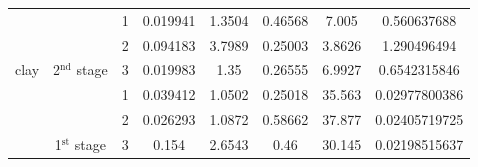 \documentclass[review]{elsarticle}
\begin{document}
\begin{table}[]
\begin{small}
\begin{tabular}{|l|c|c|c|c|c|c|c|}
                                             &                                         & \cellcolor[HTML]{C0C0C0}1 & \cellcolor[HTML]{C0C0C0}0.019941 & \cellcolor[HTML]{C0C0C0}1.3504  & \cellcolor[HTML]{C0C0C0}0.46568 & \cellcolor[HTML]{C0C0C0}7.005   & \cellcolor[HTML]{C0C0C0}0.560637688                                                                                             \\ \cline{3-8} 
                                             &                                         & 2                         & 0.094183                         & 3.7989                          & 0.25003                         & 3.8626                          & 1.290496494                                                                                                                     \\ \cline{3-8} 
\multirow{-6}{*}{clay}                       & \multirow{-3}{*}{2$^{\mbox{nd}}$ stage} & 3                         & 0.019983                         & 1.35                            & 0.26555                         & 6.9927                          & 0.6542315846                                                                                                                    \\ \hline \hline 
\multicolumn{1}{|c|}{}                       &                                         & 1                         & 0.039412                         & 1.0502                          & 0.25018                         & 35.563                          & 0.02977800386                                                                                                                   \\ \cline{3-8} 
\multicolumn{1}{|c|}{}                       &                                         & 2                         & 0.026293                         & 1.0872                          & 0.58662                         & 37.877                          & 0.02405719725                                                                                                                   \\ \cline{3-8} 
\multicolumn{1}{|c|}{}                       & \multirow{-3}{*}{1$^{\mbox{st}}$ stage} & \cellcolor[HTML]{C0C0C0}3 & \cellcolor[HTML]{C0C0C0}0.154    & \cellcolor[HTML]{C0C0C0}2.6543  & \cellcolor[HTML]{C0C0C0}0.46    & \cellcolor[HTML]{C0C0C0}30.145  & \cellcolor[HTML]{C0C0C0}0.02198515637                                                                                           \\ \cline{2-8} 

\end{tabular}
\end{small}
\end{table}
\end{document}
